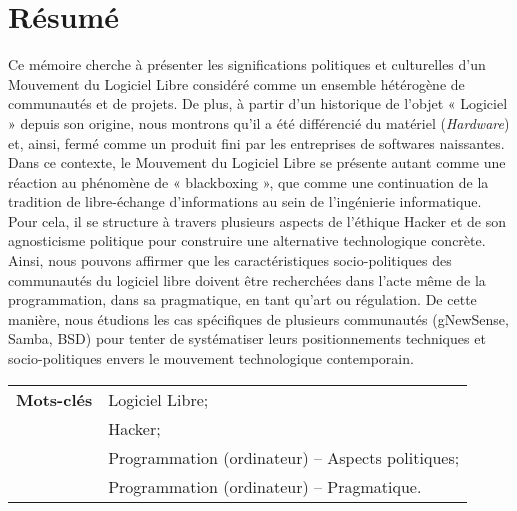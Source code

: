 \chapter*{Résumé}

Ce mémoire cherche à présenter les significations politiques et culturelles d’un Mouvement du Logiciel Libre considéré comme un ensemble hétérogène de communautés et de projets. De plus, à partir d’un historique de l’objet « Logiciel » depuis son origine, nous montrons qu’il a été différencié du matériel (\emph{Hardware}) et, ainsi, fermé comme un produit fini par les entreprises de softwares naissantes. Dans ce contexte, le Mouvement du Logiciel Libre se présente autant comme une réaction au phénomène de « blackboxing », que comme une continuation de la tradition de libre-échange d’informations au sein de l'ingénierie informatique. Pour cela, il se structure à travers plusieurs aspects de l'éthique Hacker et de son agnosticisme politique pour construire une alternative technologique concrète. Ainsi, nous pouvons affirmer que les caractéristiques socio-politiques des communautés du logiciel libre doivent être recherchées dans l’acte même de la programmation, dans sa pragmatique, en tant qu’art ou régulation. De cette manière, nous étudions les cas spécifiques de plusieurs communautés (gNewSense, Samba, BSD) pour tenter de systématiser leurs positionnements techniques et socio-politiques envers le mouvement technologique contemporain.

\vspace{2cm}

\begin{tabular}{ll}
\textbf{Mots-clés} & Logiciel Libre;\\
& Hacker;\\
& Programmation (ordinateur) -- Aspects politiques;\\
& Programmation (ordinateur) -- Pragmatique.\\
\end{tabular}

